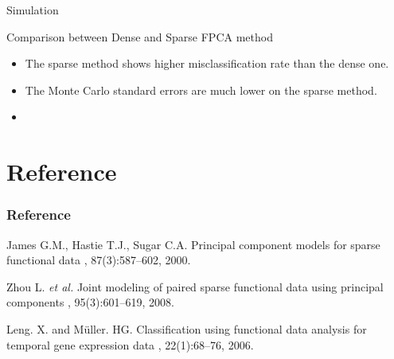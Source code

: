 \documentclass{beamer}
\begin{document}
\begin{frame}{Simulation}
	\begin{block}{Comparison between Dense and Sparse FPCA method}
		\vspace{0.1cm}
		\begin{itemize}
			\item {
				The sparse method shows higher misclassification rate than the dense one.
			}
			\item {
				The Monte Carlo standard errors are much lower on the sparse method.
			}
			\item {
				
			}
		\end{itemize}
	\end{block}
\end{frame}



\appendix
\section{Reference}
\begin{frame}
  \frametitle<presentation>{Reference}
    
  \begin{thebibliography}{10}
  	\beamertemplatearticlebibitems
		James G.M., Hastie T.J., Sugar C.A.
		\newblock Principal component models for sparse functional data
		, 87(3):587--602,
		2000.
		
   	\beamertemplatearticlebibitems
		 Zhou L. \textit{et al.}
		 \newblock Joint modeling of paired sparse functional data using principal components
		 , 95(3):601--619,
		 2008.
    
    \beamertemplatearticlebibitems
    Leng. X. and Müller. HG.
    \newblock Classification using functional data analysis for temporal gene expression data
    , 22(1):68--76,
    2006.

  \end{thebibliography}
\end{frame}
\end{document}
